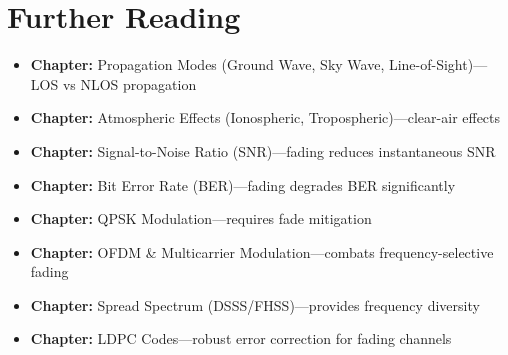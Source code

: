 \section{Further Reading}

\begin{itemize}
\item \textbf{Chapter:} Propagation Modes (Ground Wave, Sky Wave, Line-of-Sight)---LOS vs NLOS propagation
\item \textbf{Chapter:} Atmospheric Effects (Ionospheric, Tropospheric)---clear-air effects
\item \textbf{Chapter:} Signal-to-Noise Ratio (SNR)---fading reduces instantaneous SNR
\item \textbf{Chapter:} Bit Error Rate (BER)---fading degrades BER significantly
\item \textbf{Chapter:} QPSK Modulation---requires fade mitigation
\item \textbf{Chapter:} OFDM \& Multicarrier Modulation---combats frequency-selective fading
\item \textbf{Chapter:} Spread Spectrum (DSSS/FHSS)---provides frequency diversity
\item \textbf{Chapter:} LDPC Codes---robust error correction for fading channels
\end{itemize}
